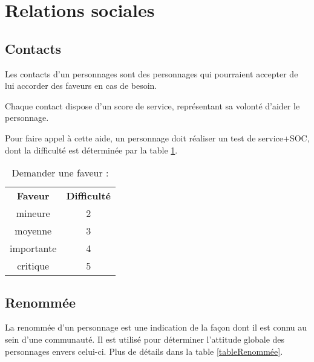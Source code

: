 \documentclass[10pt,a4paper,twocolumn]{book}
\begin{document}
\section{Relations sociales}
\subsection{Contacts}
Les contacts d’un personnages sont des personnages qui pourraient accepter de lui accorder des faveurs en cas de besoin.

Chaque contact dispose d’un score de service, représentant sa volonté d’aider le personnage.

Pour faire appel à cette aide, un personnage doit réaliser un test de service+SOC, dont la difficulté est déterminée par la table \ref{tableFaveurs}.

\begin{table}
\caption{ Demander une faveur :}
\label{tableFaveurs}
\begin{center}
\begin{tabular}{cc}
\textbf{Faveur} & \textbf{Difficulté} \\
   mineure & 2  \\
   moyenne & 3  \\
   importante & 4 \\
   critique & 5\\
\end{tabular}
\end{center}
\end{table}
\subsection{Renommée}
La renommée d’un personnage est une indication de la façon dont il est connu au sein d’une communauté. Il est utilisé pour déterminer l’attitude globale des personnages envers celui-ci. Plus de détails dans la table \ref{tableRenommée}.
\end{document}
